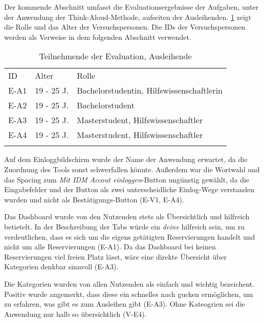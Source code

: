 Der kommende Abschnitt umfasst die Evaluationsergebnisse der Aufgaben, unter der
Anwendung der Think-Aloud-Methode, aufseiten der Ausleihenden. \ref{table:azwei}
zeigt die Rolle und das Alter der Versuchspersonen. Die IDs der Versuchspersonen
werden als Verweise in dem folgenden Abschnitt verwendet.

\begin{table}[h]
  \centering
  \caption{Teilnehmende der Evaluation, Ausleihende}
  \begin{tabular}{lll}
    \arrayrulecolor{maincolor}\hline
    \sffamily\color{maincolor}ID & \sffamily\color{maincolor}Alter &
    \sffamily\color{maincolor}Rolle \\
    \arrayrulecolor{maincolor}\hline
    E-A1                         & 19 - 25 J.                      &
    Bachelorstudentin, Hilfswissenschaftlerin \\
    E-A2                         & 19 - 25 J.                      &
    Bachelorstudent                                                  \\
    E-A3                         & 19 - 25 J.                      &
    Masterstudent, Hilfswissenschaftler \\
    E-A4                         & 19 - 25 J.                      &
    Masterstudent, Hilfswissenschaftler \\
    \arrayrulecolor{maincolor}\hline
  \end{tabular}
  \label{table:azwei}
\end{table}

Auf dem Einloggbildschirm wurde der Name der Anwendung erwartet, da die Zuordnung des Tools sonst
schwerfallen könnte. Außerdem war die Wortwahl und das Spacing zum \textit{Mit IDM Accout
einloggen}-Button ungünstig gewählt, da die Eingabefelder und der Button als zwei unterscheidliche
Einlog-Wege verstanden wurden und nicht als Bestätigungs-Button (E-V1, E-A4).


Das Dashboard wurde von den Nutzenden stets als Übersichtlich und hilfreich
betietelt. In der Beschreibung der Tabs würde ein \textit{deine} hilfreich sein,
um zu verdeutlichen, dass es sich um die eigens getätigten Reservierungen
handelt und nicht um alle Reservierungen (E-A1). Da das Dashboard bei keinen
Reservierungen viel freien Platz lässt, wäre eine direkte Übersicht über
Kategorien denkbar sinnvoll (E-A3). 

Die Kategorien wurden von allen Nutzenden als einfach und wichtig bezeichent.
Positiv wurde angemerkt, dass diese ein schnelles nach gucken ermöglichen, um zu
erfahren, was gibt es zum Ausleihen gibt (E-A3). Ohne Kateogrien sei die
Anwendung nur halb so übersichtlich (V-E4).

